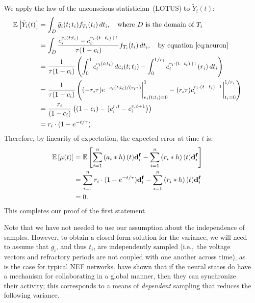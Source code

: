 We apply the law of the unconscious statistician~(LOTUS) to $\tilde{Y}_i(t)$:
\begin{align}
\label{eq:a_expectation}
\mathbb{E}\left[{\tilde{Y}_i(t)}\right] &= \int_D \tilde{y}_i(t; t_i) f_{T_i}(t_i) \,dt_i, \quad \text{where $D$ is the domain of $T_i$} \nonumber\\
          &= \int_D \frac{c_i^{e_i(t; t_i)} - c_i^{r_i \cdot (t - t_i) + 1}}{\tau(1 - c_i)} f_{T_i}(t_i) \,dt_i, \quad \text{by equation~\ref{eq:neuron}} \nonumber\\
          &= \frac{1}{\tau(1 - c_i)} \left( \int_0^{1} c_i^{e_i(t; t_i)} \,de_i(t; t_i) - \int_0^{1/r_i} c_i^{r_i \cdot (t - t_i) + 1} (r_i) \,dt_i \right) \nonumber\\
          &= \frac{1}{\tau(1 - c_i)} \left( (-r_i \tau) e^{-e_i(t; t_i)/(r_i \tau)} \bigg|_{e_i(t; t_i) = 0}^{1} - (r_i \tau) c_i^{r_i \cdot (t - t_i) + 1} \bigg|_{t_i = 0}^{1/r_i} \right) \nonumber\\
          &= \frac{r_i}{(1 - c_i)} \left(  (1 - c_i) - \left( c_i^{r_i t} - c_i^{r_i t + 1} \right)  \right) \nonumber\\
          &= r_i \cdot (1 - e^{-t/\tau}) \text{.}
\end{align}
Therefore, by linearity of expectation, the expected error at time $t$ is:
\begin{equation}
\begin{aligned}
\mathbb{E}\left[{\mathbf{\mu}(t)}\right] &= \mathbb{E}\left[{\sum_{i=1}^n \left(a_i \ast h \right)(t) \mathbf{d}^{\mathbf{f}}_i - \sum_{i=1}^n \left( r_i \ast h \right)(t) \mathbf{d}^{\mathbf{f}}_i }\right] \\
&= \sum_{i=1}^n r_i \cdot (1 - e^{-t/\tau}) \mathbf{d}^{\mathbf{f}}_i - \sum_{i=1}^n \left( r_i \ast h \right)(t) \mathbf{d}^{\mathbf{f}}_i \\
&= 0 \text{.}
\end{aligned}
\end{equation}
This completes our proof of the first statement.

Note that we have not needed to use our assumption about the independence of samples.
However, to obtain a closed-form solution for the variance, we will need to assume that $g_i$, and thus $t_i$, are independently sampled (i.e.,~the voltage vectors and refractory periods are not coupled with one another across time), as is the case for typical NEF networks.
\citet{boerlin2013predictive} have shown that if the neural states do have a mechanism for collaborating in a global manner, then they can synchronize their activity; this corresponds to a means of \emph{dependent} sampling that reduces the following variance.

